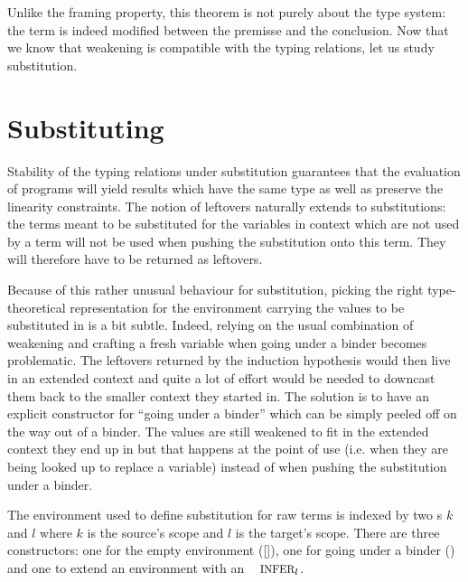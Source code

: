\documentclass[a4paper,UKenglish]{lipics-v2016}
\begin{document}
Unlike the framing property, this theorem is not purely about the
type system: the term is indeed modified between the premisse and
the conclusion. Now that we know that weakening is compatible with
the typing relations, let us study substitution.


\section{Substituting}\label{sec:substitution}

Stability of the typing relations under substitution guarantees
that the evaluation of programs will yield results which have
the same type as well as preserve the linearity constraints.
The notion of leftovers naturally extends to substitutions: the
terms meant to be substituted for the variables in context which
are not used by a term will not be used when pushing the substitution
onto this term. They will therefore have to be returned as leftovers.

Because of this rather unusual behaviour for substitution, picking
the right type-theoretical representation for the environment
carrying the values to be substituted in is a bit subtle. Indeed,
relying on the usual combination of weakening and crafting a fresh
variable when going under a binder becomes problematic. The leftovers
returned by the induction hypothesis would then live in an extended
context and quite a lot of effort would be needed to downcast them
back to the smaller context they started in. The solution is to have
an explicit constructor for ``going under a binder'' which can be
simply peeled off on the way out of a binder. The values are still
weakened to fit in the extended context they end up in but that happens
at the point of use (i.e. when they are being looked up to replace a
variable) instead of when pushing the substitution under a binder.


\begin{definition}The environment \Env{} used to define substitution
for raw terms is indexed by two \Nat{}s $k$ and $l$ where $k$ is the
source's scope and $l$ is the target's scope. There are three constructors:
one for the empty environment ([]), one for going under a binder (\envextend{})
and one to extend an environment with an $\Inferable{l}$.
\end{definition}
\end{document}
